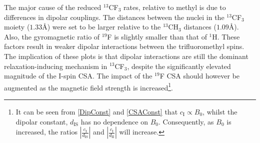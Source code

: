 The major cause of the reduced $^{13}$CF$_3$ rates, relative to methyl is due to differences in dipolar couplings. The distances between the nuclei in the $^{13}$CF$_3$ moiety ($\num{1.33} \si{\angstrom}$) were set to be larger relative to the $^{13}$CH$_3$ distances ($\num{1.09} \si{\angstrom}$). Also, the gyromagnetic ratio of $^{19}$F is slightly smaller than that of $^1$H. These factors result in weaker dipolar interactions between the trifluoromethyl spins. The implication of these plots is that dipolar interactions are still the dominant relaxation-inducing mechanism in $^{13}$CF$_3$, despite the significantly elevated magnitude of the I-spin CSA. The impact of the $^{19}$F CSA should however be augmented as the magnetic field strength is increased\footnote{It can be seen from \ref{DipConst} and \ref{CSAConst} that $c_{\text{I}} \propto B_0$, whilst the dipolar constant, $d_{\text{IS}}$ has no dependence on $B_0$. Consequently, as $B_0$ is increased, the ratios $|\frac{c_{\text{I}}}{d_{\text{IS}}}|$ and $|\frac{c_{\text{I}}}{d_{\text{II}}}|$ will increase.}.
